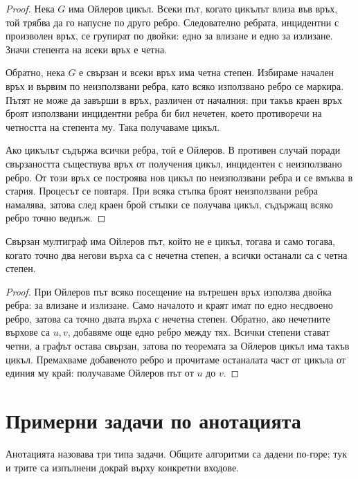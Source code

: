 \begin{proof}
Нека $G$ има Ойлеров цикъл. Всеки път, когато цикълът влиза във връх, той трябва да го напусне по друго ребро. Следователно ребрата, инцидентни с произволен връх, се групират по двойки: едно за влизане и едно за излизане. Значи степента на всеки връх е четна.

Обратно, нека $G$ е свързан и всеки връх има четна степен. Избираме начален връх и вървим по неизползвани ребра, като всяко използвано ребро се маркира. Пътят не може да завърши в връх, различен от началния: при такъв краен връх броят използвани инцидентни ребра би бил нечетен, което противоречи на четността на степента му. Така получаваме цикъл.

Ако цикълът съдържа всички ребра, той е Ойлеров. В противен случай поради свързаността съществува връх от получения цикъл, инцидентен с неизползвано ребро. От този връх се построява нов цикъл по неизползвани ребра и се вмъква в стария. Процесът се повтаря. При всяка стъпка броят неизползвани ребра намалява, затова след краен брой стъпки се получава цикъл, съдържащ всяко ребро точно веднъж.
\end{proof}

\begin{cor}
Свързан мултиграф има Ойлеров път, който не е цикъл, тогава и само тогава, когато точно два негови върха са с нечетна степен, а всички останали са с четна степен.
\end{cor}

\begin{proof}
При Ойлеров път всяко посещение на вътрешен връх използва двойка ребра: за влизане и излизане. Само началото и краят имат по едно несдвоено ребро, затова са точно двата върха с нечетна степен. Обратно, ако нечетните върхове са $u,v$, добавяме още едно ребро между тях. Всички степени стават четни, а графът остава свързан, затова по теоремата за Ойлеров цикъл има такъв цикъл. Премахваме добавеното ребро и прочитаме останалата част от цикъла от единия му край: получаваме Ойлеров път от $u$ до $v$.
\end{proof}

\section{Примерни задачи по анотацията}\label{s:3.7}

Анотацията назовава три типа задачи. Общите алгоритми са дадени по-горе; тук и
трите са изпълнени докрай върху конкретни входове.

